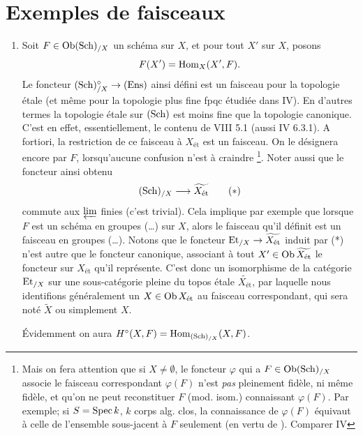 \documentclass[10pt]{../fichiers-configuration-latex/smfart}
\begin{document}
\section{Exemples de faisceaux}\pageoriginale

\begin{enumerate}
\renewcommand{\theenumi}{\alph{enumi}}
\renewcommand{\labelenumi}{\theenumi)}
\item Soit $F \in \operatorname{Ob} (\operatorname{Sch})_{/X}$ un schéma sur $X$, et
  pour tout $X'$ sur $X$, posons
$$
F(X') = \operatorname{Hom}_X (X', F){}.
$$
Le foncteur $(\Sch)^{\circ}_{/X} \to (\Ens)$ ainsi défini est un
faisceau pour la topologie étale (et même pour la topologie plus
fine fpqc étudiée dans  IV). En d'autres termes la topologie
étale sur $(\operatorname{Sch})$ est moins fine que la topologie canonique. C'est
en effet, essentiellement, le contenu de  VIII 5.1 (\cf aussi
 IV 6.3.1). A fortiori, la restriction de ce faisceau à
$X_{\text{ét}}$ est un faisceau. On le désignera encore par $F$,
lorsqu'aucune confusion n'est à craindre \footnote{Mais
on fera attention que si $X \neq
  ∅$, le foncteur $\varphi$ qui a $F \in \operatorname{Ob} (\operatorname{Sch})_{/X}$
  associe le faisceau correspondant $\varphi(F)$ n'est \emph{pas}
  pleinement fidèle, ni même fidèle, et qu'on ne peut reconstituer $F$
(mod. isom.) connaissant $\varphi(F)$. Par exemple; si $S = \operatorname{Spec} k$,
  $k$ corps alg. clos, la connaissance de $\varphi(F)$ équivaut à
  celle de l'ensemble sous-jacent à $F$ seulement (en vertu de
  ).
Comparer IV}. Noter aussi que le foncteur ainsi obtenu
\begin{equation*}
(\Sch)_{/X} \to \widetilde{X_{\text{ét}}}\tag{$\ast$}
\end{equation*}
commute aux $\varprojlim$ finies (c'est trivial). Cela implique par
exemple que lorsque $F$ est un schéma en groupes (\resp\ldots) sur $X$,
alors le faisceau qu'il définit est un faisceau en groupes (\resp\ldots).
 Notons que le foncteur $\Et_{/X} \to \widetilde{X_{\text{ét}}}$
induit par (*) n'est autre que le foncteur canonique, associant à
tout $X'\in \operatorname{Ob} \widetilde{X_{\text{ét}}}$ le foncteur sur
$X_{\text{ét}}$ qu'il représente. C'est donc un isomorphisme de la
catégorie $\operatorname{Et}_{/X}$ sur une sous-catégorie pleine du topos étale
$\widetilde{X_{\text{ét}}}$, par laquelle nous identifions
généralement un $X \in \operatorname{Ob} X_{\text{ét}}$  au faisceau
correspondant, qui sera noté $\widetilde{X}$ ou simplement $X$.

Évidemment on aura $H^{\circ}(X, F) = \operatorname{Hom}_{(\operatorname{Sch})_{/X}} (X, F)$.


\end{enumerate}
\end{document}
